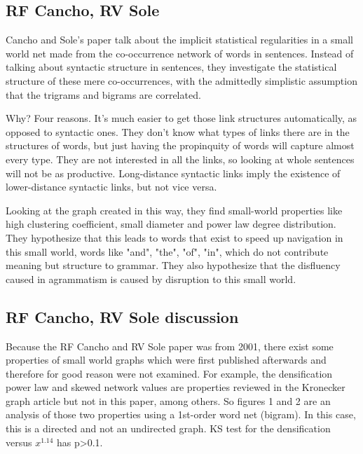 \documentclass[12pt]{article}
\begin{document}
\subsection{RF Cancho, RV Sole}
Cancho and Sole's paper talk about the implicit statistical regularities in a small world net made from the co-occurrence network of words in sentences. Instead of talking about syntactic structure in sentences, they investigate the statistical structure of these mere co-occurrences, with the admittedly simplistic assumption that the trigrams and bigrams are correlated.

Why? Four reasons. It's much easier to get those link structures automatically, as opposed to syntactic ones. They don't know what types of links there are in the structures of words, but just having the propinquity of words will capture almost every type. They are not interested in all the links, so looking at whole sentences will not be as productive. Long-distance syntactic links imply the existence of lower-distance syntactic links, but not vice versa.

Looking at the graph created in this way, they find small-world properties like high clustering coefficient, small diameter and power law degree distribution. They hypothesize that this leads to words that exist to speed up navigation in this small world, words like "and", "the", "of", "in", which do not contribute meaning but structure to grammar. They also hypothesize that the disfluency caused in agrammatism is caused by disruption to this small world.

\subsection{RF Cancho, RV Sole discussion}

Because the RF Cancho and RV Sole paper was from 2001, there exist some properties of small world graphs which were first published afterwards and therefore for good reason were not examined. For example, the densification power law\cite{densificationpowerlaw} and skewed network values\cite{netvalskew} are properties reviewed in the Kronecker graph article but not in this paper, among others. So figures 1 and 2 are an analysis of those two properties using a 1st-order word net (bigram). In this case, this is a directed and not an undirected graph. KS test for the densification versus $x^{1.14}$ has p>0.1. %
\end{document}
